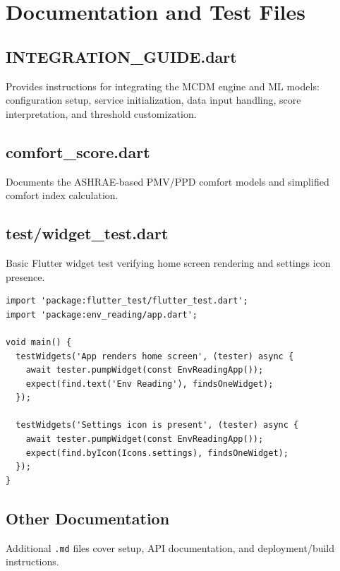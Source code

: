 \documentclass[12pt,a4paper,oneside]{report}
\begin{document}
\chapter{Documentation and Test Files}
\label{ch:docs}

\section{INTEGRATION\_GUIDE.dart}

Provides instructions for integrating the MCDM engine and ML models: configuration setup, service initialization, data input handling, score interpretation, and threshold customization.

\section{comfort\_score.dart}

Documents the ASHRAE-based PMV/PPD comfort models and simplified comfort index calculation.

\section{test/widget\_test.dart}

Basic Flutter widget test verifying home screen rendering and settings icon presence.

\begin{lstlisting}[style=dartstyle]
import 'package:flutter_test/flutter_test.dart';
import 'package:env_reading/app.dart';

void main() {
  testWidgets('App renders home screen', (tester) async {
    await tester.pumpWidget(const EnvReadingApp());
    expect(find.text('Env Reading'), findsOneWidget);
  });

  testWidgets('Settings icon is present', (tester) async {
    await tester.pumpWidget(const EnvReadingApp());
    expect(find.byIcon(Icons.settings), findsOneWidget);
  });
}
\end{lstlisting}

\section{Other Documentation}

Additional \texttt{.md} files cover setup, API documentation, and deployment/build instructions.

\end{document}
